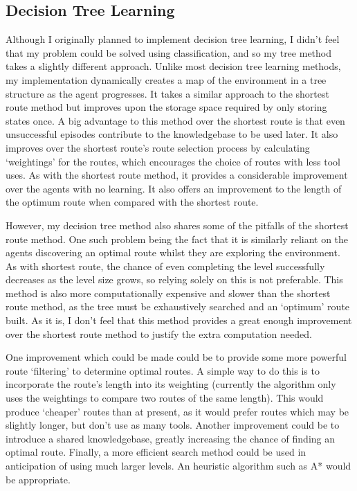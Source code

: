 \documentclass[a4paper,oneside]{report}
\begin{document}
\subsection{Decision Tree Learning}

Although I originally planned to implement decision tree learning, I didn't feel that my problem could be solved using classification, and so my tree method takes a slightly different approach. Unlike most decision tree learning methods, my implementation dynamically creates a map of the environment in a tree structure as the agent progresses. It takes a similar approach to the shortest route method but improves upon the storage space required by only storing states once. A big advantage to this method over the shortest route is that even unsuccessful episodes contribute to the knowledgebase to be used later. It also improves over the shortest route's route selection process by calculating `weightings' for the routes, which encourages the choice of routes with less tool uses. As with the shortest route method, it provides a considerable improvement over the agents with no learning. It also offers an improvement to the length of the optimum route when compared with the shortest route. 

However, my decision tree method also shares some of the pitfalls of the shortest route method. One such problem being the fact that it is similarly reliant on the agents discovering an optimal route whilst they are exploring the environment. As with shortest route, the chance of even completing the level successfully decreases as the level size grows, so relying solely on this is not preferable. This method is also more computationally expensive and slower than the shortest route method, as the tree must be exhaustively searched and an `optimum' route built. As it is, I don't feel that this method provides a great enough improvement over the shortest route method to justify the extra computation needed.

One improvement which could be made could be to provide some more powerful route `filtering' to determine optimal routes. A simple way to do this is to incorporate the route's length into its weighting (currently the algorithm only uses the weightings to compare two routes of the same length). This would produce `cheaper' routes than at present, as it would prefer routes which may be slightly longer, but don't use as many tools. Another improvement could be to introduce a shared knowledgebase, greatly increasing the chance of finding an optimal route. Finally, a more efficient search method could be used in anticipation of using much larger levels. An heuristic algorithm such as A* would be appropriate.
\end{document}
